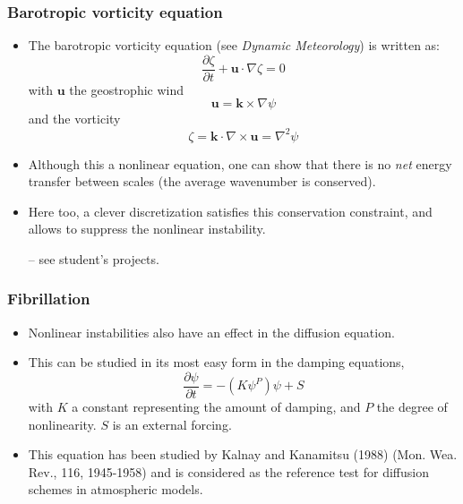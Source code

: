 \documentclass[aspectratio=43,9pt]{beamer}
\begin{document}
%
%
\begin{frame}
	\frametitle{Barotropic vorticity equation}
	\begin{itemize}
		\item The barotropic vorticity equation (see \emph{Dynamic Meteorology}) is written as:
			\begin{equation*}
				\frac{\partial \zeta}{\partial t} + \bm u \cdot \nabla \zeta = 0
			\end{equation*}
			with $\bm u$ the geostrophic wind\vspace*{-1mm}
			\begin{equation*}
				\bm u = \bm k \times \nabla \psi
			\end{equation*}
			and the vorticity\vspace*{-1mm}
			\begin{equation*}
				\zeta = \bm k \cdot \nabla \times \bm u =\nabla^2\psi
			\end{equation*}
		\item Although this a nonlinear equation, one can show that there is no \emph{net} energy transfer between scales (the average wavenumber is conserved).
		\item Here too, a clever discretization satisfies this conservation constraint, and allows to suppress the nonlinear instability.
			\par\vspace*{2ex}
			-- see student's projects.
	\end{itemize}
\end{frame}
%
%
\begin{frame}
	\frametitle{Fibrillation}
	\begin{itemize}
		\item Nonlinear instabilities also have an effect in the diffusion equation.\vspace*{2ex}
		\item This can be studied in its most easy form in the damping equations,
			\begin{equation*}
				\frac{\partial \psi}{\partial t} = - \left( K \psi^P \right) \psi + S
			\end{equation*}
			with $K$ a constant representing the amount of damping, and $P$ the degree of nonlinearity. $S$ is an external forcing.\vspace*{2ex}
		\item This equation has been studied by Kalnay and Kanamitsu (1988) (Mon. Wea. Rev., 116, 1945-1958) and is considered as the reference test for diffusion schemes in atmospheric models.
	\end{itemize}
\end{frame}
\end{document}

